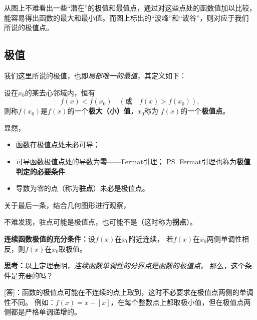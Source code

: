 从图上不难看出一些“潜在”的极值和最值点，通过对这些点处的函数值加以比较，
能容易得出函数的最大和最小值。而图上标出的“波峰”和“波谷”，则对应于我们
所说的极值点。

\subsection{极值}

我们这里所说的极值，也即{\it 局部唯一的最值}，其定义如下：

\begin{thx}
	设在$x_0$的某去心邻域内，恒有
	$$f(x)<f(x_0)\quad (\mbox{或}\quad f(x)>f(x_0)),$$
	则称$f(x_0)$是$f(x)$的一个{\bf 极大（小）值}，$x_0$称为
	$f(x)$的一个{\bf 极值点}。
\end{thx}

显然，
\begin{itemize}
  \setlength{\itemindent}{1cm}
  \item 函数在极值点处未必可导； 
  \item 可导函数极值点处的导数为零——{\kaishu Fermat引理}；
  \ps{Fermat引理也称为{\bf 极值判定的必要条件}} 
  \item 导数为零的点（称为{\bf 驻点}）未必是极值点。
\end{itemize}

关于最后一条，结合几何图形进行观察，
\begin{center}
\end{center}
不难发现，驻点可能是极值点，也可能不是（这时称为{\bf 拐点}）。

\begin{thx}
	{\bf 连续函数极值的充分条件：}设$f(x)$在$x_0$附近连续，
	若$f(x)$在$x_0$两侧单调性相反，则$f(x)$在$x_0$取极值。
\end{thx}

{\bf 思考：}以上定理表明，{\it 连续函数单调性的分界点是函数的极值点。}
那么，这个条件是充要的吗？

[答]：函数的极值点可能在不连续的点上取到，这时不必要求在极值点两侧的单调性不同。
例如：$f(x)=x-[x]$，在每个整数点上都取极小值，但在极值点两侧都是严格单调递增的。

